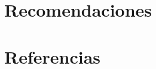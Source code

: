 \documentclass[10pt, letterpaper]{report}
\newcommand{\defaultparformat}[1]{
	{\setlength{\parskip}{2ex}
    }
}
\begin{document}
	\chapter{Recomendaciones}
	\ifdefined\parpordefecto
		\defaultparformat{recomendaciones}
	\else
		
	\fi
\fi

\ifdefined\CAPrecomendaciones
    \newpage
    \chapter{Referencias}
    \ifdefined\parpordefecto
    \defaultparformat{bibliografia_manual}
    \else
    
    \fi
\fi

\ifdefined\CAPanexos
	\newpage
	\ifdefined\parpordefecto
		\defaultparformat{anexos_A}
	\else
		
	\fi
\fi

\ifdefined\CAPanexos
	\ifdefined\parpordefecto
		\defaultparformat{anexos_B}
	\else
		
	\fi
\fi


\end{document}
